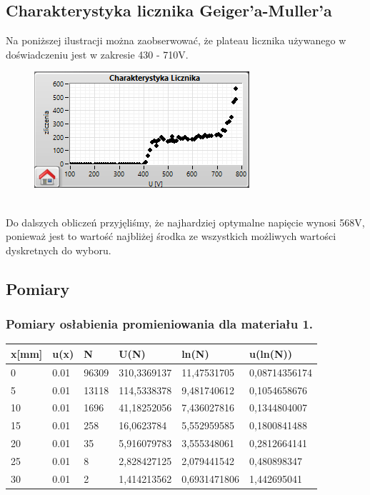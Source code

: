 \documentclass{article}
\begin{document}
\subsection{Charakterystyka licznika Geiger'a-Muller'a}
Na poniższej ilustracji można zaobserwować, że plateau licznika używanego w doświadczeniu jest w zakresie 430 - 710V. \\
\begin{figure}[h!]
    \centering
    \includegraphics{Licznik.PNG}
\end{figure}\\
Do dalszych obliczeń przyjęliśmy, że najhardziej optymalne napięcie wynosi 568V, ponieważ jest to wartość najbliżej środka ze wszystkich możliwych wartości dyskretnych do wyboru.


\subsection{Pomiary}
\subsubsection{Pomiary osłabienia promieniowania dla materiału 1. }
\begin{table}[h!]
\centering
\begin{tabular}{|l|l|l|l|l|l|}
\hline
x[mm]	&	u(x)	&	N	&	U(N)	&	ln(N)	&	u(ln(N))	 \\ \hline
0	&	0.01	&	96309	&	310,3369137	&	11,47531705	&	0,08714356174	\\
5	&	0.01	&	13118	&	114,5338378	&	9,481740612	&	0,1054658676	\\
10	&	0.01	&	1696	&	41,18252056	&	7,436027816	&	0,1344804007	\\
15	&	0.01	&	258	&	16,0623784	&	5,552959585	&	0,1800841488	\\
20	&	0.01	&	35	&	5,916079783	&	3,555348061	&	0,2812664141	\\
25	&	0.01	&	8	&	2,828427125	&	2,079441542	&	0,480898347	\\
30	&	0.01	&	2	&	1,414213562	&	0,6931471806	&	1,442695041	\\
\hline
\end{tabular}
\end{table}
\end{document}
